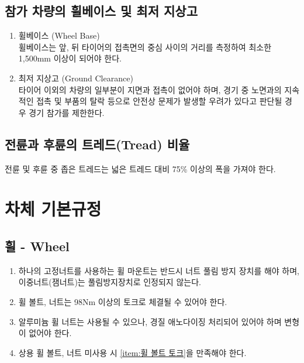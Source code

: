 \documentclass[final,a4paper,10pt]{report}
\begin{document}
\section{참가 차량의 휠베이스 및 최저 지상고}\label{rule:formula-technical.wheelbase-ground-clearance}
\begin{enumerate}
  \item\label{rule:formula-technical.wheelbase-ground-clearance.min-wheelbase-1500mm} 휠베이스 (Wheel Base)\\
    휠베이스는 앞, 뒤 타이어의 접촉면의 중심 사이의 거리를 측정하여 최소한 1,500mm 이상이 되어야 한다.
  \item\label{rule:formula-technical.wheelbase-ground-clearance.tire-only-ground-contact} 최저 지상고 (Ground Clearance)\\
    타이어 이외의 차량의 일부분이 지면과 접촉이 없어야 하며, 경기 중 노면과의 지속적인 접촉 및 부품의 탈락 등으로 안전상 문제가 발생할 우려가 있다고 판단될 경우 경기 참가를 제한한다.
\end{enumerate}

\section{전륜과 후륜의 트레드(Tread) 비율}\label{rule:formula-technical.track-ratio}
전륜 및 후륜 중 좁은 트레드는 넓은 트레드 대비 75\% 이상의 폭을 가져야 한다.


\chapter{차체 기본규정}

\section{휠 - Wheel}\label{rule:formula-technical.wheels}
\begin{enumerate}
  \item\label{rule:formula-technical.wheels.single-nut-anti-loosening} 하나의 고정너트를 사용하는 휠 마운트는 반드시 너트 풀림 방지 장치를 해야 하며, 이중너트(잼너트)는 풀림방지장치로 인정되지 않는다.
  \item\label{rule:formula-technical.wheels.min-torque-98nm} \label{item:휠 볼트 토크} 휠 볼트, 너트는 98Nm 이상의 토크로 체결될 수 있어야 한다.
  \item\label{rule:formula-technical.wheels.aluminum-nut-anodizing} 알루미늄 휠 너트는 사용될 수 있으나, 경질 애노다이징 처리되어 있어야 하며 변형이 없어야 한다.
  \item\label{rule:formula-technical.wheels.custom-fastener-torque} 상용 휠 볼트, 너트 미사용 시 \ref{item:휠 볼트 토크}을 만족해야 한다.
\end{enumerate}
\end{document}
